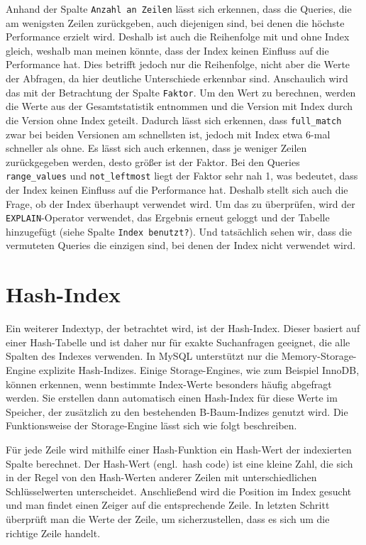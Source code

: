 Anhand der Spalte \texttt{Anzahl an Zeilen} lässt sich erkennen, dass die Queries, die am wenigsten Zeilen zurückgeben, auch diejenigen sind, bei denen die höchste Performance erzielt wird.
Deshalb ist auch die Reihenfolge mit und ohne Index gleich, weshalb man meinen könnte, dass der Index keinen Einfluss auf die Performance hat.
Dies betrifft jedoch nur die Reihenfolge, nicht aber die Werte der Abfragen, da hier deutliche Unterschiede erkennbar sind.
Anschaulich wird das mit der Betrachtung der Spalte \texttt{Faktor}.
Um den Wert zu berechnen, werden die Werte aus der Gesamtstatistik entnommen und die Version mit Index durch die Version ohne Index geteilt.
Dadurch lässt sich erkennen, dass \texttt{full\_match} zwar bei beiden Versionen am schnellsten ist, jedoch mit Index etwa 6-mal schneller als ohne.
Es lässt sich auch erkennen, dass je weniger Zeilen zurückgegeben werden, desto größer ist der Faktor.
Bei den Queries \texttt{range\_values} und \texttt{not\_leftmost} liegt der Faktor sehr nah 1, was bedeutet, dass der Index keinen Einfluss auf die Performance hat.
Deshalb stellt sich auch die Frage, ob der Index überhaupt verwendet wird.
Um das zu überprüfen, wird der \texttt{EXPLAIN}-Operator verwendet, das Ergebnis erneut geloggt und der Tabelle hinzugefügt (siehe Spalte \texttt{Index benutzt?}).
Und tatsächlich sehen wir, dass die vermuteten Queries die einzigen sind, bei denen der Index nicht verwendet wird.

\section{Hash-Index}\label{sec:indexing-hash-index}
Ein weiterer Indextyp, der betrachtet wird, ist der Hash-Index.
Dieser basiert auf einer Hash-Tabelle und ist daher nur für exakte Suchanfragen geeignet, die alle Spalten des Indexes verwenden.
In MySQL unterstützt nur die Memory-Storage-Engine explizite Hash-Indizes.
Einige Storage-Engines, wie zum Beispiel InnoDB, können erkennen, wenn bestimmte Index-Werte besonders häufig abgefragt werden.
Sie erstellen dann automatisch einen Hash-Index für diese Werte im Speicher, der zusätzlich zu den bestehenden B-Baum-Indizes genutzt wird.
Die Funktionsweise der Storage-Engine lässt sich wie folgt beschreiben.

Für jede Zeile wird mithilfe einer Hash-Funktion ein Hash-Wert der indexierten Spalte berechnet.
Der Hash-Wert (engl.\ hash code) ist eine kleine Zahl, die sich in der Regel von den Hash-Werten anderer Zeilen mit unterschiedlichen Schlüsselwerten unterscheidet.
Anschließend wird die Position im Index gesucht und man findet einen Zeiger auf die entsprechende Zeile.
In letzten Schritt überprüft man die Werte der Zeile, um sicherzustellen, dass es sich um die richtige Zeile handelt.

